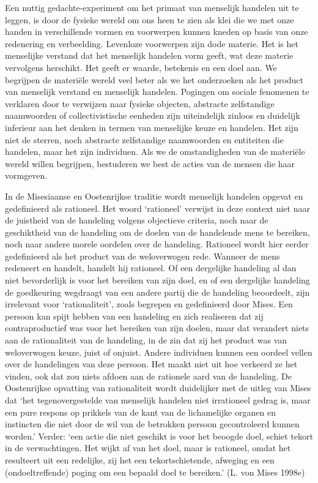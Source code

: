 \documentclass[
  a5paper,
  smalldemyvopaper,11pt,twoside,onecolumn,openright,extrafontsizes,
hidelinks]{memoir}
\begin{document}
Een nuttig gedachte-experiment om het primaat van menselijk handelen uit
te leggen, is door de fysieke wereld om ons heen te zien als klei die we
met onze handen in verschillende vormen en voorwerpen kunnen kneden op
basis van onze redenering en verbeelding. Levenloze voorwerpen zijn dode
materie. Het is het menselijke verstand dat het menselijk handelen vorm
geeft, wat deze materie vervolgens herschikt. Het geeft er waarde,
betekenis en een doel aan. We begrijpen de materiële wereld veel beter
als we het onderzoeken als het product van menselijk verstand en
menselijk handelen. Pogingen om sociale fenomenen te verklaren door te
verwijzen naar fysieke objecten, abstracte zelfstandige naamwoorden of
collectivistische eenheden zijn uiteindelijk zinloos en duidelijk
inferieur aan het denken in termen van menselijke keuze en handelen. Het
zijn niet de sterren, noch abstracte zelfstandige naamwoorden en
entiteiten die handelen, maar het zijn individuen. Als we de
omstandigheden van de materiële wereld willen begrijpen, bestuderen we
best de acties van de mensen die haar vormgeven.

In de Misesiaanse en Oostenrijkse traditie wordt menselijk handelen
opgevat en gedefinieerd als rationeel. Het woord `rationeel' verwijst in
deze context niet naar de juistheid van de handeling volgens objectieve
criteria, noch naar de geschiktheid van de handeling om de doelen van de
handelende mens te bereiken, noch naar andere morele oordelen over de
handeling. Rationeel wordt hier eerder gedefinieerd als het product van
de weloverwogen rede. Wanneer de mens redeneert en handelt, handelt hij
rationeel. Of een dergelijke handeling al dan niet bevorderlijk is voor
het bereiken van zijn doel, en of een dergelijke handeling de
goedkeuring wegdraagt van een andere partij die de handeling beoordeelt,
zijn irrelevant voor `rationaliteit', zoals begrepen en gedefinieerd
door Mises. Een persoon kan spijt hebben van een handeling en zich
realiseren dat zij contraproductief was voor het bereiken van zijn
doelen, maar dat verandert niets aan de rationaliteit van de handeling,
in de zin dat zij het product was van weloverwogen keuze, juist of
onjuist. Andere individuen kunnen een oordeel vellen over de handelingen
van deze persoon. Het maakt niet uit hoe verkeerd ze het vinden, ook dat
zou niets afdoen aan de rationele aard van de handeling. De Oostenrijkse
opvatting van rationaliteit wordt duidelijker met de uitleg van Mises
dat `het tegenovergestelde van menselijk handelen niet irrationeel
gedrag is, maar een pure respons op prikkels van de kant van de
lichamelijke organen en instincten die niet door de wil van de betrokken
persoon gecontroleerd kunnen worden.' Verder: `een actie die niet
geschikt is voor het beoogde doel, schiet tekort in de verwachtingen.
Het wijkt af van het doel, maar is rationeel, omdat het resulteert uit
een redelijke, zij het een tekortschietende, afweging en een
(ondoeltreffende) poging om een bepaald doel te bereiken.' (L. von Mises
1998e)
\end{document}
